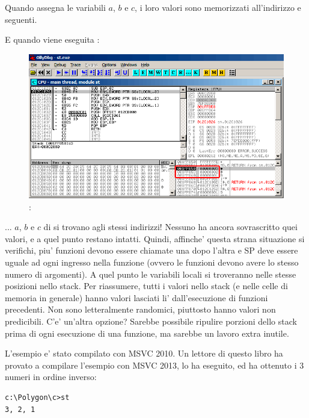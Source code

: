 Quando  assegna le variabili $a$, $b$ e $c$, i loro valori sono memorizzati all'indirizzo  e seguenti.

\clearpage
E quando viene eseguita :

\begin{figure}[H]
\centering
\includegraphics[scale=\FigScale]{patterns/02_stack/08_noise/olly2.png}
\caption{\olly: }
\label{fig:stack_noise_olly2}
\end{figure}

... $a$, $b$ e $c$ di  si trovano agli stessi indirizzi!
Nessuno ha ancora sovrascritto quei valori, e a quel punto restano intatti.
Quindi, affinche' questa strana situazione si verifichi, piu' funzioni devono essere chiamate una dopo l'altra e
\ac{SP} deve essere uguale ad ogni ingresso nella funzione (ovvero le funzioni devono avere lo stesso numero di argomenti).
A quel punto le variabili locali si troveranno nelle stesse posizioni nello stack.
Per riassumere, tutti i valori nello stack (e nelle celle di memoria in generale) hanno valori lasciati li' dall'esecuzione di funzioni precedenti.
Non sono letteralmente randomici, piuttosto hanno valori non predicibili.
C'e' un'altra opzione?
Sarebbe possibile ripulire porzioni dello stack prima di ogni esecuzione di una funzione, ma sarebbe un lavoro extra inutile.


L'esempio e' stato compilato con MSVC 2010.
Un lettore di questo libro ha provato a compilare l'esempio con MSVC 2013, lo ha eseguito, ed ha ottenuto i 3 numeri in ordine inverso:%

\begin{lstlisting}
c:\Polygon\c>st
3, 2, 1
\end{lstlisting}

